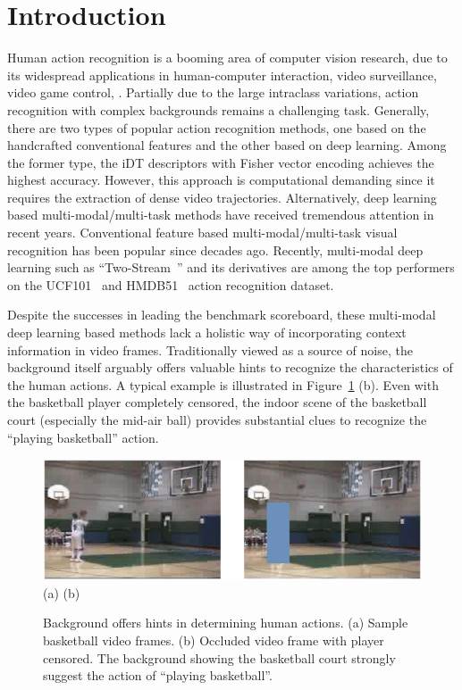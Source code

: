 \documentclass[10pt,twocolumn,letterpaper]{article}
\begin{document}
\section{Introduction}
Human action recognition is a booming area of computer vision research, due to its widespread applications in human-computer interaction, video surveillance, video game control, \etc. Partially due to the large intraclass variations, action recognition with complex backgrounds remains a challenging task. Generally, there are two types of popular action recognition methods, one based on the handcrafted conventional features and the other based on deep learning. Among the former type, the iDT descriptors \cite{wang2013action} with Fisher vector encoding achieves the highest accuracy. However, this approach is computational demanding since it requires the extraction of dense video trajectories. Alternatively, deep learning based multi-modal/multi-task methods have received tremendous attention in recent years. Conventional feature based multi-modal/multi-task visual recognition \cite{zhang2015can,zhang2015auxiliary,zhang2015multi} has been popular since decades ago. Recently, multi-modal deep learning such as ``Two-Stream~\cite{simonyan2014two}'' and its derivatives \cite{Feichtenhofer16, wang2016two,WangQT15a, sun2015human, wang2016temporal} are among the top performers on the UCF101~\cite{soomro2012ucf101} and HMDB51~\cite{Kuehne11} action recognition dataset. 
%


Despite the successes in leading the benchmark scoreboard, these multi-modal deep learning based methods lack a holistic way of incorporating context information in video frames. Traditionally viewed as a source of noise, the background itself arguably offers valuable hints to recognize the characteristics of the human actions. A typical example is illustrated in Figure~\ref{bask_vs} (b). Even with the basketball player completely censored, the indoor scene of the basketball court (especially the mid-air ball) provides substantial clues to recognize the ``playing basketball'' action. 
%
\begin{figure}[t]
\begin{center}
%
\includegraphics[scale=0.6]{imgs/bask_vs.eps}\\
(a) \hspace{2.8in} (b) \\
\caption{Background offers hints in determining human actions. (a) Sample basketball video frames. (b) Occluded video frame with player censored. The background showing the basketball court strongly suggest the action of ``playing basketball''.}
\label{bask_vs}
\end{center}
\end{figure}
%
\end{document}
